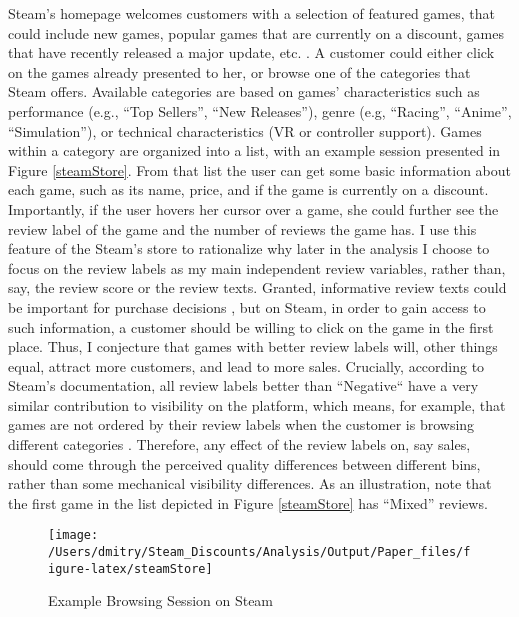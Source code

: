 \documentclass[
  12pt,
  pagebackref]{article}
\begin{document}
Steam's homepage welcomes customers with a selection of featured games,
that could include new games, popular games that are currently on a
discount, games that have recently released a major update, etc.
\citep{steamVisibility}. A customer could either click on the games
already presented to her, or browse one of the categories that Steam
offers. Available categories are based on games' characteristics such as
performance (e.g., ``Top Sellers'', ``New Releases''), genre (e.g,
``Racing'', ``Anime'', ``Simulation''), or technical characteristics (VR
or controller support). Games within a category are organized into a
list, with an example session presented in Figure \ref{steamStore}. From
that list the user can get some basic information about each game, such
as its name, price, and if the game is currently on a discount.
Importantly, if the user hovers her cursor over a game, she could
further see the review label of the game and the number of reviews the
game has. I use this feature of the Steam's store to rationalize why
later in the analysis I choose to focus on the review labels as my main
independent review variables, rather than, say, the review score or the
review texts. Granted, informative review texts could be important for
purchase decisions \citep{ChevalierMayzlin06}, but on Steam, in order to
gain access to such information, a customer should be willing to click
on the game in the first place. Thus, I conjecture that games with
better review labels will, other things equal, attract more customers,
and lead to more sales. Crucially, according to Steam's documentation,
all review labels better than ``Negative`` have a very similar
contribution to visibility on the platform, which means, for example,
that games are not ordered by their review labels when the customer is
browsing different categories \citeyearpar{steamVisibility2}. Therefore,
any effect of the review labels on, say sales, should come through the
perceived quality differences between different bins, rather than some
mechanical visibility differences. As an illustration, note that the
first game in the list depicted in Figure \ref{steamStore} has ``Mixed''
reviews.

\begin{figure}[h]
 
 {\centering \texttt{[image: /Users/dmitry/Steam\_Discounts/Analysis/Output/Paper\_files/figure-latex/steamStore]} 
 
 }
 
 \caption{\label{steamStore}Example Browsing Session on Steam}\label{fig:unnamed-chunk-3}
 \end{figure}
\end{document}
